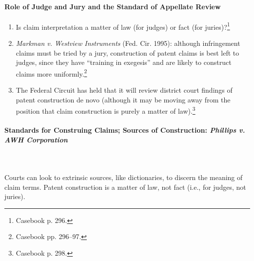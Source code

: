 \paragraph{Role of Judge and Jury and the Standard of Appellate Review}

\begin{enumerate}
    \item Is claim interpretation a matter of law (for judges) or fact (for 
    juries)?\footnote{Casebook p. 296.}
    \item \emph{Markman v. Westview Instruments} (Fed. Cir. 1995): although 
    infringement claims must be tried by a jury, construction of patent claims 
    is best left to judges, since they have ``training in exegesis'' and are 
    likely to construct claims more uniformly.\footnote{Casebook pp. 296--97.}
    \item The Federal Circuit has held that it will review district court 
    findings of patent construction de novo (although it may be moving away from 
    the position that claim construction is purely a matter of 
    law).\footnote{Casebook p. 298.}
\end{enumerate}

\paragraph{Standards for Construing Claims; Sources of Construction: 
\emph{Phillips v. AWH Corporation}}
~\\\\
Courts can look to extrinsic sources, like dictionaries, to discern the 
meaning of claim terms. Patent construction is a matter of law, not fact 
(i.e., for judges, not juries).

